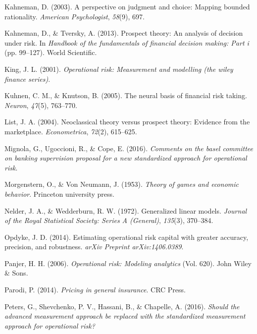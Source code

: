 \documentclass{DissertateUSU}
\begin{document}
\leavevmode\hypertarget{ref-kahneman2003perspective}{}%
Kahneman, D. (2003). A perspective on judgment and choice: Mapping
bounded rationality. \emph{American Psychologist}, \emph{58}(9), 697.

\leavevmode\hypertarget{ref-kahneman2013prospect}{}%
Kahneman, D., \& Tversky, A. (2013). Prospect theory: An analysis of
decision under risk. In \emph{Handbook of the fundamentals of financial
decision making: Part i} (pp. 99--127). World Scientific.

\leavevmode\hypertarget{ref-king2001operational}{}%
King, J. L. (2001). \emph{Operational risk: Measurement and modelling
(the wiley finance series)}.

\leavevmode\hypertarget{ref-kuhnen2005neural}{}%
Kuhnen, C. M., \& Knutson, B. (2005). The neural basis of financial risk
taking. \emph{Neuron}, \emph{47}(5), 763--770.

\leavevmode\hypertarget{ref-list2004neoclassical}{}%
List, J. A. (2004). Neoclassical theory versus prospect theory: Evidence
from the marketplace. \emph{Econometrica}, \emph{72}(2), 615--625.

\leavevmode\hypertarget{ref-mignola2016comments}{}%
Mignola, G., Ugoccioni, R., \& Cope, E. (2016). \emph{Comments on the
basel committee on banking supervision proposal for a new standardized
approach for operational risk}.

\leavevmode\hypertarget{ref-morgenstern1953theory}{}%
Morgenstern, O., \& Von Neumann, J. (1953). \emph{Theory of games and
economic behavior}. Princeton university press.

\leavevmode\hypertarget{ref-nelder1972generalized}{}%
Nelder, J. A., \& Wedderburn, R. W. (1972). Generalized linear models.
\emph{Journal of the Royal Statistical Society: Series A (General)},
\emph{135}(3), 370--384.

\leavevmode\hypertarget{ref-opdyke2014estimating}{}%
Opdyke, J. D. (2014). Estimating operational risk capital with greater
accuracy, precision, and robustness. \emph{arXiv Preprint
arXiv:1406.0389}.

\leavevmode\hypertarget{ref-panjer2006operational}{}%
Panjer, H. H. (2006). \emph{Operational risk: Modeling analytics} (Vol.
620). John Wiley \& Sons.

\leavevmode\hypertarget{ref-parodi2014pricing}{}%
Parodi, P. (2014). \emph{Pricing in general insurance}. CRC Press.

\leavevmode\hypertarget{ref-peters2016should}{}%
Peters, G., Shevchenko, P. V., Hassani, B., \& Chapelle, A. (2016).
\emph{Should the advanced measurement approach be replaced with the
standardized measurement approach for operational risk?}
\end{document}
